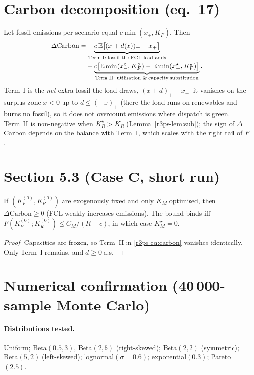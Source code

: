 \section{Carbon decomposition (eq.~17)}
Let fossil emissions per scenario equal $c\min(x_+,K_F)$. Then
\begin{align}
\Delta\text{Carbon}
&= \underbrace{c\,\mathbb E\bigl[(x+d(x))_+ - x_+\bigr]}_{\text{Term I: fossil the FCL load adds}} \notag\\
&\quad - \underbrace{c\bigl[\mathbb E\min(x_+^{\circ},K_F^{\circ})-\mathbb E\min(x_+^{\star},K_F^{\star})\bigr]}_{\text{Term II: utilisation \& capacity substitution}}. \label{r3ps-eq:carbon}
\end{align}
Term~I is the \emph{net} extra fossil the load draws, $(x+d)_+-x_+$; it vanishes on the surplus zone $x<0$ up to $d\le(-x)_+$ (there the load runs on renewables and burns no fossil), so it does not overcount emissions where dispatch is green. Term~II is non-negative when $K_R^{\star}>K_R^{\circ}$ (Lemma~\ref{r3ps-lem:sub}); the sign of $\Delta$Carbon depends on the balance with Term~I, which scales with the right tail of $F$.

\section{Section 5.3 (Case C, short run)}
\begin{corollary}\label{r3ps-cor:caseC}
If $(K_F^{(0)},K_R^{(0)})$ are exogenously fixed and only $K_M$ optimised, then $\Delta\text{Carbon}\ge 0$ (FCL weakly increases emissions). The bound binds iff $F(K_F^{(0)};K_R^{(0)})\le C_M/(R-c)$, in which case $K_M^{\star}=0$.
\end{corollary}

\begin{proof}
Capacities are frozen, so Term~II in \eqref{r3ps-eq:carbon} vanishes identically. Only Term~I remains, and $d\ge 0$ a.s.
\end{proof}

\section{Numerical confirmation (40\,000-sample Monte Carlo)}

\paragraph{Distributions tested.}
Uniform; Beta$(0.5,3)$, Beta$(2,5)$ (right-skewed); Beta$(2,2)$ (symmetric); Beta$(5,2)$ (left-skewed); lognormal$(\sigma{=}0.6)$; exponential$(0.3)$; Pareto$(2.5)$.

